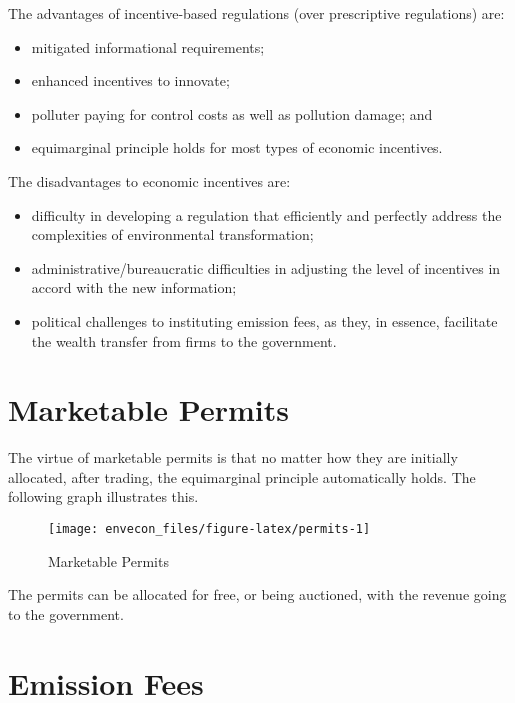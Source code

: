 \documentclass[
]{book}
\providecommand{\tightlist}{%
  \setlength{\itemsep}{0pt}\setlength{\parskip}{0pt}}
\begin{document}
The advantages of incentive-based regulations (over prescriptive regulations) are:

\begin{itemize}
\tightlist
\item
  mitigated informational requirements;
\item
  enhanced incentives to innovate;
\item
  polluter paying for control costs as well as pollution damage; and
\item
  equimarginal principle holds for most types of economic incentives.
\end{itemize}

The disadvantages to economic incentives are:

\begin{itemize}
\tightlist
\item
  difficulty in developing a regulation that efficiently and perfectly address the complexities of environmental transformation;
\item
  administrative/bureaucratic difficulties in adjusting the level of incentives in accord with the new information;
\item
  political challenges to instituting emission fees, as they, in essence, facilitate the wealth transfer from firms to the government.
\end{itemize}

\hypertarget{marketable-permits}{%
\section{Marketable Permits}\label{marketable-permits}}

The virtue of marketable permits is that no matter how they are initially allocated, after trading, the equimarginal principle automatically holds. The following graph illustrates this.

\begin{figure}

{\centering \texttt{[image: envecon\_files/figure-latex/permits-1]} 

}

\caption{Marketable Permits}\label{fig:permits}
\end{figure}

The permits can be allocated for free, or being auctioned, with the revenue going to the government.

\hypertarget{emission-fees}{%
\section{Emission Fees}\label{emission-fees}}
\end{document}
